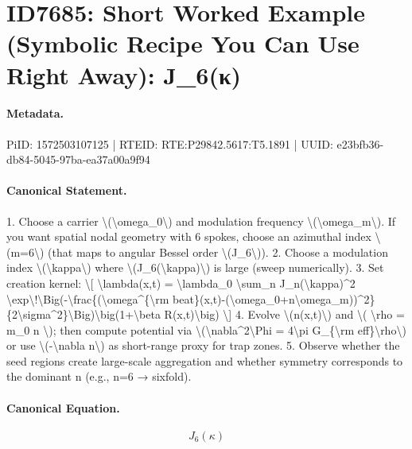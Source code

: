 \section*{ID7685: Short Worked Example (Symbolic Recipe You Can Use Right Away): J\_6(κ)}
\paragraph{Metadata.}
PiID: 1572503107125 | RTEID: RTE:P29842.5617:T5.1891 | UUID: e23bfb36-db84-5045-97ba-ea37a00a9f94

\paragraph{Canonical Statement.}
1. Choose a carrier \textbackslash{}(\textbackslash{}omega\_0\textbackslash{}) and modulation frequency \textbackslash{}(\textbackslash{}omega\_m\textbackslash{}). If you want spatial nodal geometry with 6 spokes, choose an azimuthal index \textbackslash{}(m=6\textbackslash{}) (that maps to angular Bessel order \textbackslash{}(J\_6\textbackslash{})). 2. Choose a modulation index \textbackslash{}(\textbackslash{}kappa\textbackslash{}) where \textbackslash{}(J\_6(\textbackslash{}kappa)\textbackslash{}) is large (sweep numerically). 3. Set creation kernel: \textbackslash{}[ \textbackslash{}lambda(x,t) = \textbackslash{}lambda\_0 \textbackslash{}sum\_n J\_n(\textbackslash{}kappa)\textasciicircum{}2 \textbackslash{}exp\textbackslash{}!\textbackslash{}Big(-\textbackslash{}frac\{(\textbackslash{}omega\textasciicircum{}\{\textbackslash{}rm beat\}(x,t)-(\textbackslash{}omega\_0+n\textbackslash{}omega\_m))\textasciicircum{}2\}\{2\textbackslash{}sigma\textasciicircum{}2\}\textbackslash{}Big)\textbackslash{}big(1+\textbackslash{}beta R(x,t)\textbackslash{}big) \textbackslash{}] 4. Evolve \textbackslash{}(n(x,t)\textbackslash{}) and \textbackslash{}( \textbackslash{}rho = m\_0 n \textbackslash{}); then compute potential via \textbackslash{}(\textbackslash{}nabla\textasciicircum{}2\textbackslash{}Phi = 4\textbackslash{}pi G\_\{\textbackslash{}rm eff\}\textbackslash{}rho\textbackslash{}) or use \textbackslash{}(-\textbackslash{}nabla n\textbackslash{}) as short-range proxy for trap zones. 5. Observe whether the seed regions create large-scale aggregation and whether symmetry corresponds to the dominant n (e.g., n=6 → sixfold).

\paragraph{Canonical Equation.}
\[
J_6(\kappa)
\]

